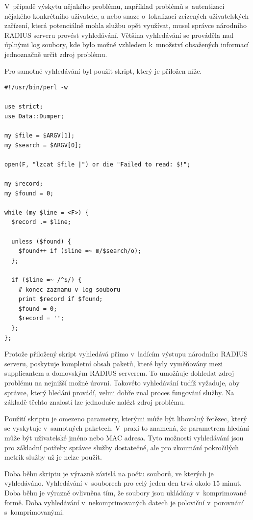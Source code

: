 \documentclass[thesis=M,czech]{FITthesis}[2012/06/26]
\begin{document}
    V~případě výskytu nějakého problému, například
    problémů s~autentizací nějakého konkrétního uživatele,
    a nebo snaze o~lokalizaci zcizených uživatelských zařízení, která potenciálně mohla
    službu opět využívat, musel správce národního RADIUS serveru provést vyhledávání.
    Většina vyhledávání se prováděla nad úplnými log soubory, 
    kde bylo možné vzhledem k~množství obsažených informací jednoznačně určit zdroj problému.

    Pro samotné vyhledávání byl použit skript, který je přiložen níže.
    \begin{verbatim}
#!/usr/bin/perl -w

use strict;
use Data::Dumper;

my $file = $ARGV[1];
my $search = $ARGV[0];

open(F, "lzcat $file |") or die "Failed to read: $!";

my $record;
my $found = 0;

while (my $line = <F>) {
  $record .= $line;

  unless ($found) {
    $found++ if ($line =~ m/$search/o);
  };

  if ($line =~ /^$/) {
    # konec zaznamu v log souboru
    print $record if $found;
    $found = 0;
    $record = '';
  };
};
    \end{verbatim}

    Protože přiložený skript vyhledává přímo v~ladícím výstupu národního RADIUS serveru,     
    poskytuje kompletní obsah paketů,
    které byly vyměňovány mezi supplicantem a domovským RADIUS serverem.
    To umožňuje dohledat zdroj problému na nejnižší možné úrovni.
    Takovéto vyhledávání tudíž vyžaduje, aby správce, který hledání provádí,
    velmi dobře znal proces fungování služby.
    Na základě těchto znalostí lze jednoduše nalézt zdroj problému.

    Použití skriptu je omezeno parametry, kterými může být libovolný
    řetězec, který se vyskytuje v~samotných paketech.
    V~praxi to znamená, že parametrem hledání může být uživatelské jméno
    nebo MAC adresa.
    Tyto možnosti vyhledávání jsou pro základní potřeby správce služby dostatečné,
    ale pro zkoumání pokročilých metrik služby už je nelze použít.

    Doba běhu skriptu je výrazně závislá na počtu souborů, ve kterých je vyhledáváno.
    Vyhledávání v~souborech pro celý jeden den trvá okolo 15 minut.
    Doba běhu je výrazně ovlivněna tím, že soubory jsou ukládány v~komprimované formě.
    Doba vyhledávání v~nekomprimovaných datech je poloviční v~porovnání s~komprimovanými.
    
\end{document}
